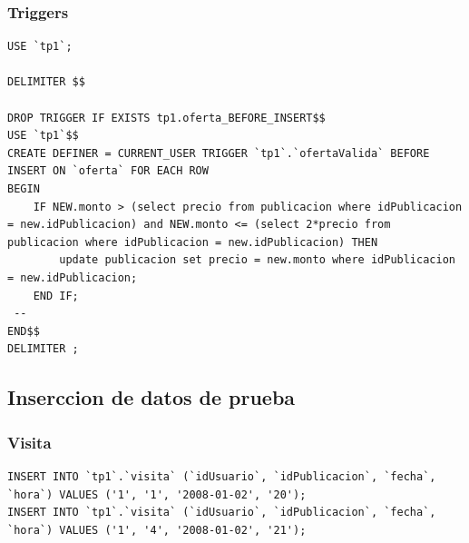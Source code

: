 \documentclass[a4paper, 10pt, twoside]{article}
\begin{document}
\subsubsection{Triggers}
\begin{verbatim}
USE `tp1`;

DELIMITER $$

DROP TRIGGER IF EXISTS tp1.oferta_BEFORE_INSERT$$
USE `tp1`$$
CREATE DEFINER = CURRENT_USER TRIGGER `tp1`.`ofertaValida` BEFORE INSERT ON `oferta` FOR EACH ROW
BEGIN
	IF NEW.monto > (select precio from publicacion where idPublicacion = new.idPublicacion) and NEW.monto <= (select 2*precio from publicacion where idPublicacion = new.idPublicacion) THEN
		update publicacion set precio = new.monto where idPublicacion = new.idPublicacion;
	END IF;
 -- 
END$$
DELIMITER ;

\end{verbatim}

\subsection{Inserccion de datos de prueba}



















































\subsubsection{Visita}
\begin{verbatim}
INSERT INTO `tp1`.`visita` (`idUsuario`, `idPublicacion`, `fecha`, `hora`) VALUES ('1', '1', '2008-01-02', '20');
INSERT INTO `tp1`.`visita` (`idUsuario`, `idPublicacion`, `fecha`, `hora`) VALUES ('1', '4', '2008-01-02', '21');
\end{verbatim}
\end{document}
